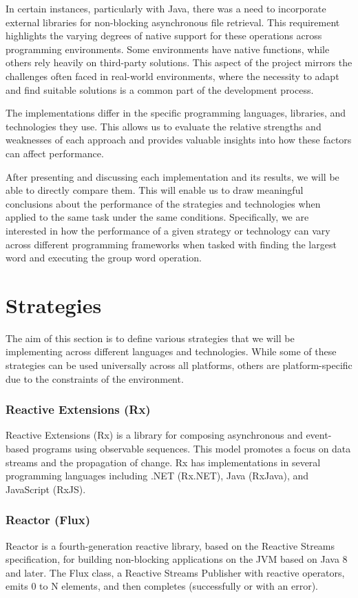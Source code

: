 In certain instances, particularly with Java, there was a need to incorporate external libraries for non-blocking asynchronous file retrieval. This requirement highlights the varying degrees of native support for these operations across programming environments. Some environments have native functions, while others rely heavily on third-party solutions. This aspect of the project mirrors the challenges often faced in real-world environments, where the necessity to adapt and find suitable solutions is a common part of the development process.

The implementations differ in the specific programming languages, libraries, and technologies they use. This allows us to evaluate the relative strengths and weaknesses of each approach and provides valuable insights into how these factors can affect performance.

After presenting and discussing each implementation and its results, we will be able to directly compare them. This will enable us to draw meaningful conclusions about the performance of the strategies and technologies when applied to the same task under the same conditions. Specifically, we are interested in how the performance of a given strategy or technology can vary across different programming frameworks when tasked with finding the largest word and executing the group word operation.


\section{Strategies}
\label{subsec:strategies}

The aim of this section is to define various strategies that we will be implementing across different languages and technologies. While some of these strategies can be used universally across all platforms, others are platform-specific due to the constraints of the environment.

\subsubsection{Reactive Extensions (Rx)}
\label{subsubsec:rx}
Reactive Extensions (Rx) is a library for composing asynchronous and event-based programs using observable sequences. This model promotes a focus on data streams and the propagation of change. Rx has implementations in several programming languages including .NET (Rx.NET), Java (RxJava), and JavaScript (RxJS).

\subsubsection{Reactor (Flux)}
\label{subsubsec:reactor_flux}
Reactor is a fourth-generation reactive library, based on the Reactive Streams specification, for building non-blocking applications on the JVM based on Java 8 and later. The Flux class, a Reactive Streams Publisher with reactive operators, emits 0 to N elements, and then completes (successfully or with an error).

